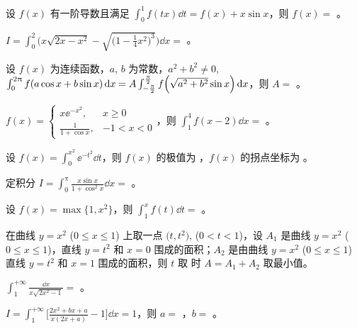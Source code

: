 \begin{ti}
	设 $f(x)$ 有一阶导数且满足 $\int_0^1 f(tx) \dd{t} = f(x) + x \sin x$，则 $f(x) = $ \hua。
\end{ti}

\begin{ti}
	$I = \int_0^2 \Biggl( x \sqrt{2x - x^2} - \sqrt{ \biggl( 1 - \frac{1}{4}x^2 \biggr)^3 } \Biggr) \dd{x} = $ \hua。
\end{ti}

\begin{ti}
	设 $f(x)$ 为连续函数，$a$, $b$ 为常数，$a^2 + b^2 \ne 0$, $\int_0^{2\uppi} f(a \cos x + b \sin x) \dd{x} = A \int_{-\frac{\uppi}{2}}^{\frac{\uppi}{2}} f \Bigl( \sqrt{a^2+b^2} \sin x \Bigr) \dd{x}$，则 $A = $ \hua。 
\end{ti}

\begin{ti}
	$f(x) = \begin{cases}
		x \ee^{-x^2}, & x \geq 0 \\
		\frac{1}{1 + \cos x}, & -1 < x < 0
	\end{cases}$，则 $\int_1^4 f(x-2) \dd{x} = $ \hua。
\end{ti}

\begin{ti}
	设 $f(x) = \int_0^{x^2} \ee^{-t^2} \dd{t}$，则 $f(x)$ 的极值为 \hua，$f(x)$ 的拐点坐标为 \hua。
\end{ti}

\begin{ti}
	定积分 $I = \int_0^\uppi \frac{x \sin x}{1 + \cos^2 x} \dd{x} = $ \hua。
\end{ti}

\begin{ti}
	设 $f(x) = \max \bigl\{ 1,x^2 \bigr\}$，则 $\int_1^x f(t) \dd{t} = $ \hua。
\end{ti}

\begin{ti}
	在曲线 $y = x^2$ ($0 \leq x \leq 1$) 上取一点 $\bigl( t,t^2 \bigr)$, ($0 < t < 1$)，设 $A_1$ 是曲线 $y = x^2$ ($0 \leq x \leq 1$)，直线 $y = t^2$ 和 $x = 0$ 围成的面积；$A_2$ 是由曲线 $y = x^2$ ($0 \leq x \leq 1$) 直线 $y = t^2$ 和 $x = 1$ 围成的面积，则 $t$ 取 \hua{} 时 $A = A_1 + A_2$ 取最小值。
\end{ti}

\begin{ti}
	$\int_1^{+\infty} \frac{\dd{x}}{x \sqrt{2x^2 - 1}} = $ \hua。
\end{ti}

\begin{ti}
	$I = \int_1^{+\infty} \biggl[ \frac{2x^2 + bx + a}{x(2x + a)} - 1 \biggr] \dd{x} = 1$，则 $a = $ \hua，$b = $ \hua。
\end{ti}

